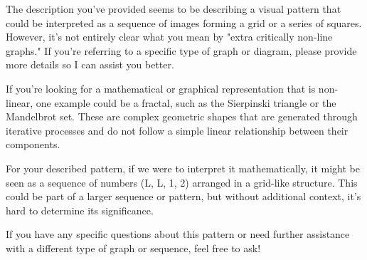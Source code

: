 The description you've provided seems to be describing a visual pattern that could be interpreted as a sequence of images forming a grid or a series of squares. However, it's not entirely clear what you mean by "extra critically non-line graphs." If you're referring to a specific type of graph or diagram, please provide more details so I can assist you better.

If you're looking for a mathematical or graphical representation that is non-linear, one example could be a fractal, such as the Sierpinski triangle or the Mandelbrot set. These are complex geometric shapes that are generated through iterative processes and do not follow a simple linear relationship between their components.

For your described pattern, if we were to interpret it mathematically, it might be seen as a sequence of numbers (L, L, 1, 2) arranged in a grid-like structure. This could be part of a larger sequence or pattern, but without additional context, it's hard to determine its significance.

If you have any specific questions about this pattern or need further assistance with a different type of graph or sequence, feel free to ask!